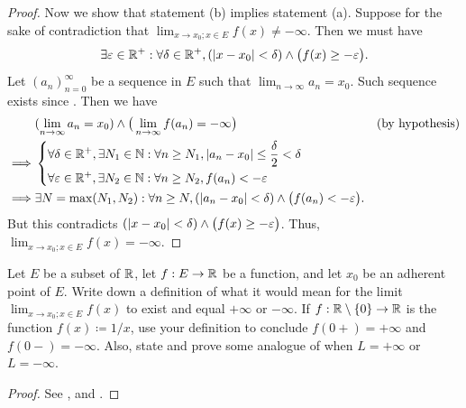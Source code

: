 \begin{proof}
  Now we show that statement (b) implies statement (a).
  Suppose for the sake of contradiction that \(\lim_{x \to x_0 ; x \in E} f(x) \neq -\infty\).
  Then we must have
  \[
    \exists \varepsilon \in \mathbb{R}^+ : \forall \delta \in \mathbb{R}^+, (\left\lvert x - x_0\right\rvert < \delta) \land \big(f(x) \geq -\varepsilon\big).
  \]
  Let \((a_n)_{n = 0}^\infty\) be a sequence in \(E\) such that \(\lim_{n \to \infty} a_n = x_0\).
  Such sequence exists since .
  Then we have
  \begin{align*}
             & (\lim_{n \to \infty} a_n = x_0) \land \big(\lim_{n \to \infty} f(a_n) = -\infty\big)                                 &  & \text{(by hypothesis)} \\
    \implies & \begin{dcases}
                 \forall \delta \in \mathbb{R}^+, \exists N_1 \in \mathbb{N} : \forall n \geq N_1, \left\lvert a_n - x_0\right\rvert \leq \dfrac{\delta}{2} < \delta \\
                 \forall \varepsilon \in \mathbb{R}^+, \exists N_2 \in \mathbb{N} : \forall n \geq N_2, f(a_n) < -\varepsilon
               \end{dcases}                                \\
    \implies & \exists N = \max(N_1, N_2) : \forall n \geq N, (\left\lvert a_n - x_0\right\rvert < \delta) \land \big(f(a_n) < -\varepsilon\big).
  \end{align*}
  But this contradicts \((\left\lvert x - x_0\right\rvert < \delta) \land \big(f(x) \geq -\varepsilon\big)\).
  Thus, \(\lim_{x \to x_0 ; x \in E} f(x) = -\infty\).
\end{proof}

\exercisesection

\begin{ex}\label{i:ex:9.5.1}
  Let \(E\) be a subset of \(\mathbb{R}\), let \(f : E \to \mathbb{R}\) be a function, and let \(x_0\) be an adherent point of \(E\).
  Write down a definition of what it would mean for the limit \(\lim_{x \to x_0 ; x \in E} f(x)\) to exist and equal \(+\infty\) or \(-\infty\).
  If \(f : \mathbb{R} \setminus \left\lbrace0\right\rbrace \to \mathbb{R}\) is the function \(f(x) \coloneqq 1 / x\), use your definition to conclude \(f(0+) = +\infty\) and \(f(0-) = -\infty\).
  Also, state and prove some analogue of  when \(L = +\infty\) or \(L = -\infty\).
\end{ex}

\begin{proof}
  See ,  and .
\end{proof}
